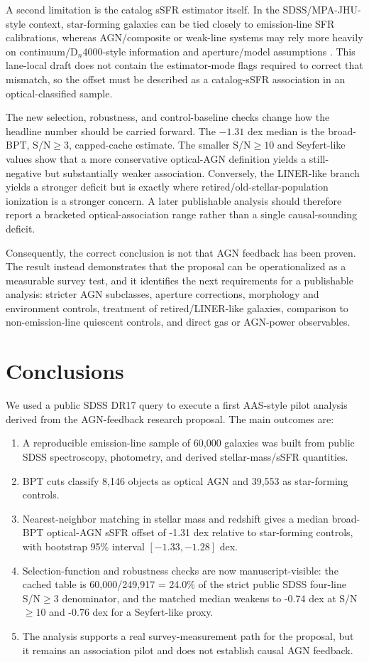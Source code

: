 \documentclass[twocolumn]{aastex631}
\begin{document}
A second limitation is the catalog sSFR estimator itself.  In the SDSS/MPA-JHU-style context, star-forming galaxies can be tied closely to emission-line SFR calibrations, whereas AGN/composite or weak-line systems may rely more heavily on continuum/D$_n$4000-style information and aperture/model assumptions \citep{brinchmann2004}.  This lane-local draft does not contain the estimator-mode flags required to correct that mismatch, so the offset must be described as a catalog-sSFR association in an optical-classified sample.

The new selection, robustness, and control-baseline checks change how the headline number should be carried forward.  The $-1.31$ dex median is the broad-BPT, S/N$\geq3$, capped-cache estimate.  The smaller S/N$\geq10$ and Seyfert-like values show that a more conservative optical-AGN definition yields a still-negative but substantially weaker association.  Conversely, the LINER-like branch yields a stronger deficit but is exactly where retired/old-stellar-population ionization is a stronger concern.  A later publishable analysis should therefore report a bracketed optical-association range rather than a single causal-sounding deficit.

Consequently, the correct conclusion is not that AGN feedback has been proven.  The result instead demonstrates that the proposal can be operationalized as a measurable survey test, and it identifies the next requirements for a publishable analysis: stricter AGN subclasses, aperture corrections, morphology and environment controls, treatment of retired/LINER-like galaxies, comparison to non-emission-line quiescent controls, and direct gas or AGN-power observables.

\section{Conclusions}\label{sec:conclusions}
We used a public SDSS DR17 query to execute a first AAS-style pilot analysis derived from the AGN-feedback research proposal.  The main outcomes are:
\begin{enumerate}
\item A reproducible emission-line sample of 60,000 galaxies was built from public SDSS spectroscopy, photometry, and derived stellar-mass/sSFR quantities.
\item BPT cuts classify 8,146 objects as optical AGN and 39,553 as star-forming controls.
\item Nearest-neighbor matching in stellar mass and redshift gives a median broad-BPT optical-AGN sSFR offset of -1.31 dex relative to star-forming controls, with bootstrap 95\% interval $[-1.33,-1.28]$ dex.
\item Selection-function and robustness checks are now manuscript-visible: the cached table is 60,000/249,917 = 24.0\% of the strict public SDSS four-line S/N$\geq3$ denominator, and the matched median weakens to -0.74 dex at S/N$\geq10$ and -0.76 dex for a Seyfert-like proxy.
\item The analysis supports a real survey-measurement path for the proposal, but it remains an association pilot and does not establish causal AGN feedback.
\end{enumerate}
\end{document}

